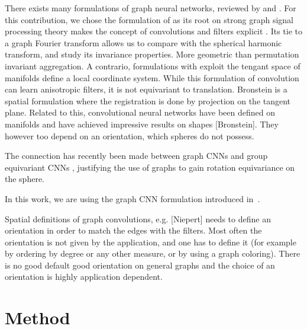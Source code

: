 \documentclass[final,twocolumn,3p,times,authoryear]{elsarticle}
\newcommand{\todo}[1]{{\color[rgb]{.6,.1,.6}{#1}}}
\newcommand{\1}{\b{1}}              %
\newcommand{\0}{\b{0}}              %
\begin{document}
There exists many formulations of graph neural networks, reviewed by \citet{bronstein2017review} and \citet{hamilton2017review}. For this contribution, we chose the formulation of \citet{defferrard2016convolutional} as its root on strong graph signal processing theory makes the concept of convolutions and filters explicit \citep{shuman2013emerging}. Its tie to a graph Fourier transform allows us to compare with the spherical harmonic transform, and study its invariance properties. More geometric than permutation invariant aggregation. A contrario, formulations with exploit the tengant space of manifolds define a local coordinate system. While this formulation of convolution can learn anisotropic filters, it is not equivariant to translation. \todo{better wording}
\todo{three main interpretations: gsp, Bronstein manifold tangent plane, message passing, permutation invariant aggregation, spatial formulations}
Bronstein is a spatial formulation where the registration is done by projection on the tangent plane.
Related to this, convolutional neural networks have been defined on manifolds and have achieved impressive results on shapes [Bronstein]. They however too depend on an orientation, which spheres do not possess.


The connection has recently been made between graph CNNs and group equivariant CNNs \cite{kondor2018equivariance}, justifying the use of graphs to gain rotation equivariance on the sphere.

In this work, we are using the graph CNN formulation introduced in~\cite{defferrard2016convolutional}.

Spatial definitions of graph convolutions, e.g. [Niepert] needs to define an orientation in order to match the edges with the filters. Most often the orientation is not given by the application, and one has to define it (for example by ordering by degree or any other measure, or by using a graph coloring). There is no good default good orientation on general graphs and the choice of an orientation is highly application dependent.

\section{Method}
\label{sec:method}
\end{document}
